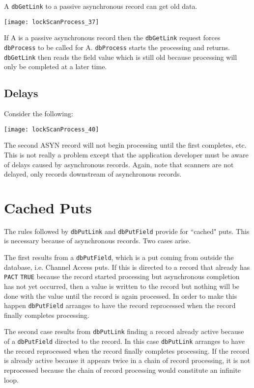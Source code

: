 A \verb|dbGetLink| to a passive asynchronous record can get old data.

\begin{center}
\texttt{[image: lockScanProcess\_37]}
\end{center}

If A is a passive asynchronous record then the \verb|dbGetLink| request forces \verb|dbProcess| to be called for A.
\verb|dbProcess| starts the processing and returns.
\verb|dbGetLink| then reads the field value which is still old because processing will only be completed at a later time.

\subsection{Delays}

Consider the following:

\begin{center}
\texttt{[image: lockScanProcess\_40]}
\end{center}

The second ASYN record will not begin processing until the first completes, etc.
This is not really a problem except that the application developer must be aware of delays caused by asynchronous records.
Again, note that scanners are not delayed, only records downstream of asynchronous records.

\section{Cached Puts}

The rules followed by \verb|dbPutLink| and \verb|dbPutField| provide for ``cached" puts.
This is necessary because of asynchronous records.
Two cases arise.

The first results from a \verb|dbPutField|, which is a put coming from outside the database, i.e. Channel Access puts.
If this is directed to a record that already has \verb|PACT| \verb|TRUE| because the record started processing but asynchronous completion has not yet occurred, then a value is written to the record but nothing will be done with the value until the record is again 
processed.
In order to make this happen \verb|dbPutField| arranges to have the record reprocessed when the record finally completes processing.

The second case results from \verb|dbPutLink| finding a record already active because of a \verb|dbPutField| directed to the record.
In this case \verb|dbPutLink| arranges to have the record reprocessed when the record finally completes processing.
If the record is already active because it appears twice in a chain of record processing, it is not reprocessed because the chain of record processing would constitute an infinite loop.


